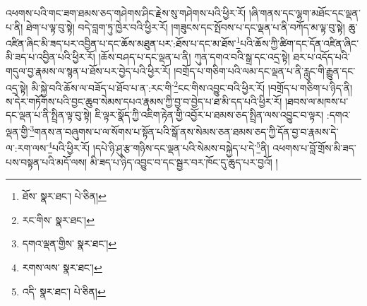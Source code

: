 འཕགས་པའི་གང་ཟག་ཐམས་ཅད་གཤེགས་ཤིང་རྗེས་སུ་གཤེགས་པའི་ཕྱིར་རོ། །ཞི་གནས་དང་ལྷག་མཐོང་དང་ལྡན་པ་ནི། ཐེག་པ་ལྟ་བུ་སྟེ། བདེ་བླག་ཏུ་ཁྱེར་བའི་ཕྱིར་རོ། །གཟུངས་དང་སྤོབས་པ་དང་ལྡན་པ་ནི་བཀོད་མ་ལྟ་བུ་སྟེ། ཆུ་འཛིན་ཞིང་མི་ཟད་པར་འབྱིན་པ་དང་ཆོས་མཐུན་པར་:ཐོས་པ་དང་མ་ཐོས་\footnote{ཐོས་  སྣར་ཐང་།  པེ་ཅིན། }པའི་ཆོས་ཀྱི་ཚིག་དང་དོན་འཛིན་ཞིང་མི་ཟད་པ་འབྱིན་པའི་ཕྱིར་རོ། །ཆོས་བཤད་པ་དང་ལྡན་པ་ནི། ཀུན་དགའ་བའི་སྒྲ་དང་འདྲ་སྟེ། ཐར་པ་འདོད་པའི་གདུལ་བྱ་རྣམས་ལ་སྙན་པ་ཐོས་པར་བྱེད་པའི་ཕྱིར་རོ། །བགྲོད་པ་གཅིག་པའི་ལམ་དང་ལྡན་པ་ནི་རླུང་གི་རྒྱུན་དང་འདྲ་སྟེ། མི་སྐྱེ་བའི་ཆོས་ལ་བཟོད་པ་ཐོབ་པ་ན་:རང་གི་\footnote{རང་གིས་  སྣར་ཐང་། }ངང་གིས་འབྱུང་བའི་ཕྱིར་རོ། །བགྲོད་པ་གཅིག་པ་ཉིད་ནི། ས་དེར་གཏོགས་པའི་བྱང་ཆུབ་སེམས་དཔའ་རྣམས་ཀྱི་བྱ་བ་བྱེད་པ་ཐ་མི་དད་པའི་ཕྱིར་རོ། །ཐབས་ལ་མཁས་པ་དང་ལྡན་པ་ནི་སྤྲིན་ལྟ་བུ་སྟེ། ཇི་ལྟར་སྣོད་ཀྱི་འཇིག་རྟེན་གྱི་འབྱོར་པ་ཐམས་ཅད་སྤྲིན་ལས་འབྱུང་བ་ལྟར། :དགའ་ལྡན་གྱི་\footnote{དགའ་ལྡན་གྱིས་  སྣར་ཐང་། }གནས་ན་བཞུགས་པ་ལ་སོགས་པ་སྟོན་པའི་སྒོ་ནས་སེམས་ཅན་ཐམས་ཅད་ཀྱི་དོན་བྱ་བ་རྣམས་དེ་ལ་:རག་ལས་\footnote{རགས་ལས་  སྣར་ཐང་། }པའི་ཕྱིར་རོ། །དཔེ་ཉི་ཤུ་རྩ་གཉིས་དང་ལྡན་པའི་སེམས་བསྐྱེད་པ་དེ་\footnote{འདི་  སྣར་ཐང་།  པེ་ཅིན། }ནི། འཕགས་པ་བློ་གྲོས་མི་ཟད་པས་བསྟན་པའི་མདོ་ལས། མི་ཟད་པ་ཉིད་འབྱུང་བ་དང་སྦྱར་བར་ཁོང་དུ་ཆུད་པར་བྱའོ། །
